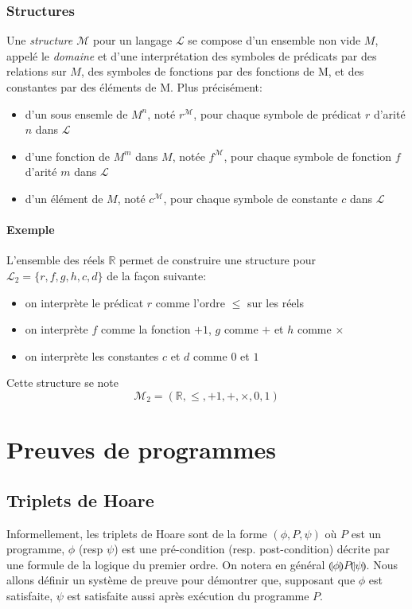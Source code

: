 \documentclass[a4paper]{article}
\begin{document}
   \subsubsection{Structures}
   Une \textit{structure $\mathcal{M}$} pour un langage $\mathcal{L}$ se compose
   d'un ensemble non vide $M$, appelé le \textit{domaine} et d'une interprétation des
   symboles de prédicats par des relations sur $M$, des symboles de fonctions
   par des fonctions de M, et des constantes par des éléments de M. Plus précisément:

   \begin{itemize}
     \item d'un sous ensemle de $M^n$, noté $r^{\mathcal{M}}$, pour chaque symbole
     de prédicat $r$ d'arité $n$ dans $\mathcal{L}$
     \item d'une fonction de $M^m$ dans $M$, notée $f^{\mathcal{M}}$, pour chaque symbole
     de fonction $f$ d'arité $m$ dans $\mathcal{L}$
     \item d'un élément de $M$, noté $c^{\mathcal{M}}$, pour chaque symbole de 
     constante $c$ dans $\mathcal{L}$
   \end{itemize}

   \paragraph{Exemple} L'ensemble des réels $\mathbb{R}$ permet de construire une 
   structure pour $\mathcal{L}_2 = \{r, f, g, h, c, d\}$ de la façon suivante:

   \begin{itemize}
     \item on interprète le prédicat $r$ comme l'ordre $\leq$ sur les réels
     \item on interprète $f$ comme la fonction $+1$, $g$ comme $+$ et $h$ comme $\times$
     \item on interprète les constantes $c$ et $d$ comme $0$ et $1$
   \end{itemize}
   Cette structure se note $$ \mathcal{M}_2 = (\mathbb{R}, \leq, +1, +, \times, 0, 1) $$ 


\section{Preuves de programmes}
  \subsection{Triplets de Hoare}
  Informellement, les triplets de Hoare sont de la forme $(\phi, P, \psi)$ où $P$
  est un programme, $\phi$ (resp $\psi$) est une pré-condition (resp. post-condition) 
  décrite par une formule de la logique du premier ordre. On notera en général $\llparenthesis \phi\rrparenthesis P \llparenthesis \psi\rrparenthesis $.
  Nous allons définir un système de preuve pour démontrer que, supposant que $\phi$
  est satisfaite, $\psi$ est satisfaite aussi après exécution du programme $P$.
\end{document}
